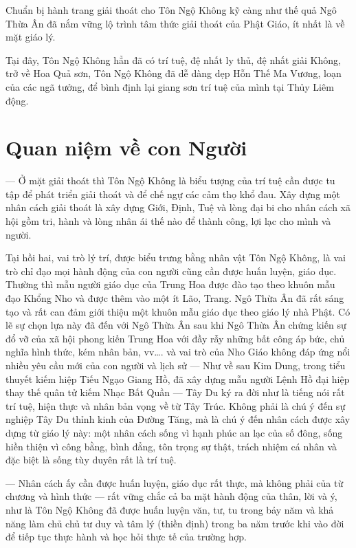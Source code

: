 Chuẩn bị hành trang giải thoát cho Tôn Ngộ Không kỹ càng như thế quả Ngô Thừa Ân đã nắm vững lộ trình tâm thức giải thoát của Phật Giáo, ít nhất là về mặt giáo lý.

Tại đây, Tôn Ngộ Không hẳn đã có trí tuệ, đệ nhất ly thủ, đệ nhất giải Không, trở về Hoa Quả sơn, Tôn Ngộ Không đã dễ dàng dẹp Hỗn Thế Ma Vương, loạn của các ngã tưởng, để bình định lại giang sơn trí tuệ của mình tại Thủy Liêm động.

\section{Quan niệm về con Người} %
\label{sec:2_quan_niem_ve_con_nguoi}

— Ở mặt giải thoát thì Tôn Ngộ Không là biểu tượng của trí tuệ cần được tu tập để phát triển giải thoát và để chế ngự các cảm thọ khổ đau. Xây dựng một nhân cách giải thoát là xây dựng Giới, Định, Tuệ và lòng đại bi cho nhân cách xã hội gồm tri, hành và lòng nhân ái thế nào để thành công, lợi lạc cho mình và người.

Tại hồi hai, vai trò lý trí, được biểu trưng bằng nhân vật Tôn Ngộ Không, là vai trò chỉ đạo mọi hành động của con người cũng cần được huấn luyện, giáo dục. Thường thì mẫu người giáo dục của Trung Hoa được đào tạo theo khuôn mẫu đạo Khổng Nho và được thêm vào một ít Lão, Trang. Ngô Thừa Ân đã rất sáng tạo và rất can đảm giới thiệu một khuôn mẫu giáo dục theo giáo lý nhà Phật. Có lẽ sự chọn lựa này đã đến với Ngô Thừa Ân sau khi Ngô Thừa Ân chứng kiến sự đổ vỡ của xã hội phong kiến Trung Hoa với đầy rẫy những bất công áp bức, chủ nghĩa hình thức, kém nhân bản, vv\ldots. và vai trò của Nho Giáo không đáp ứng nổi nhiều yêu cầu mới của con người và lịch sử — Như về sau Kim Dung, trong tiểu thuyết kiếm hiệp Tiếu Ngạo Giang Hồ, đã xây dựng mẫu người Lệnh Hồ đại hiệp thay thế quân tử kiếm Nhạc Bất Quần — Tây Du ký ra đời như là tiếng nói rất trí tuệ, hiện thực và nhân bản vọng về từ Tây Trúc. Không phải là chú ý đến sự nghiệp Tây Du thỉnh kinh của Đường Tăng, mà là chú ý đến nhân cách được xây dựng từ giáo lý này: một nhân cách sống vì hạnh phúc an lạc của số đông, sống hiền thiện vì công bằng, bình đẳng, tôn trọng sự thật, trách nhiệm cá nhân và đặc biệt là sống tùy duyên rất là trí tuệ.

— Nhân cách ấy cần được huấn luyện, giáo dục rất thực, mà không phải của từ chương và hình thức — rất vững chắc cả ba mặt hành động của thân, lời và ý, như là Tôn Ngộ Không đã được huấn luyện văn, tư, tu trong bảy năm và khả năng làm chủ chủ tư duy và tâm lý (thiền định) trong ba năm trước khi vào đời để tiếp tục thực hành và học hỏi thực tế của trường hợp.

